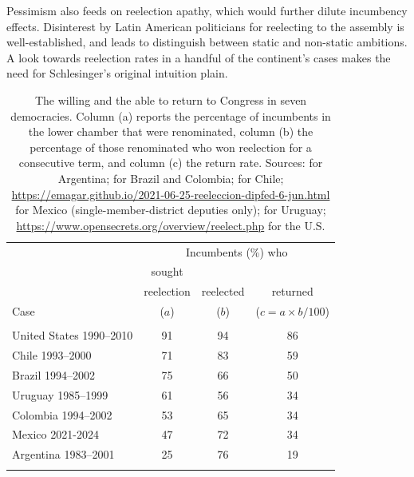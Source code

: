 \documentclass[letter,12pt]{article}
\newcommand{\mc}{\multicolumn}
\begin{document}
Pessimism also feeds on reelection apathy, which would further dilute incumbency effects. Disinterest by Latin American politicians for reelecting to the assembly is well-established, and leads \citet{morgenstern.2002b} to distinguish between static and non-static ambitions. A look towards reelection rates in a handful of the continent's cases makes the need for Schlesinger's \citeyearpar{schlesinger.1966} original intuition plain.

\begin{table}
  \centering
  \begin{tabular}{lccc}
                             & \mc{3}{c}{Incumbents (\%) who} \\ 
                             & sought      &             &            \\ [-.5ex]
                             & reelection  & reelected   & returned   \\ [-.5ex]
    Case                     &   ($a$)     &   ($b$)     & ($c=a\times b/100$) \\ \hline \\ [-1.25ex] 
    United States 1990--2010 &    91       &     94      &     86     \\ 
    Chile 1993--2000         &    71       &     83      &     59     \\
    Brazil 1994--2002        &    75       &     66      &     50     \\
    Uruguay 1985--1999       &    61       &     56      &     34     \\
    Colombia 1994--2002      &    53       &     65      &     34     \\                 
    Mexico 2021-2024         &    47       &     72      &     34     \\
    Argentina 1983--2001     &    25       &     76      &     19     \\ \\ [-1.25ex] \hline
  \end{tabular}
  \caption{The willing and the able to return to Congress in seven democracies. Column (a) reports the percentage of incumbents in the lower chamber that were renominated, column (b) the percentage of those renominated who won reelection for a consecutive term, and column (c) the return rate. Sources: \citet[][:658]{jones.etal.amateurLegis.2002} for Argentina; \citet{botero.renno-Career-reelec-br-col2007} for Brazil and Colombia; \citet{naviaIncumbency.2000} for Chile; \protect\url{https://emagar.github.io/2021-06-25-reeleccion-dipfed-6-jun.html} for Mexico (single-member-district deputies only); \citet{altman-chasquetti-Career-reelec-urug2005} for Uruguay; \protect\url{https://www.opensecrets.org/overview/reelect.php} for the U.S.}\label{T:retRate}
\end{table}
\end{document}
